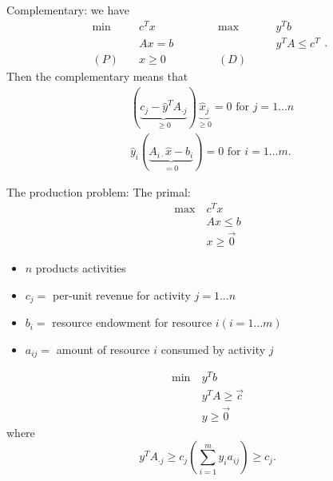 \begin{prev}
	Complementary: we have
	\[
		\begin{alignedat}{5}
			\min~&c^{T}x\qquad\qquad &&\max ~ &&y^{T}b\\
			&Ax = b && &&y^{T}A\leq c^{T}\\
			(P)\quad&x\geq  0 &&(D)\quad&&
		\end{alignedat}.
	\]
	Then the complementary means that
	\[
		\begin{split}
			&(\underbrace{c_{j} - \hat{y}^{T} A_{\cdot j}}_{\geq  0})\underbrace{\hat{x}_j}_{\geq 0} = 0 \text{ for }j = 1\ldots n\\
			&\hat{y}_i(\underbrace{A_{i\cdot}\hat{x} - b_{i}}_{=0}) = 0\text{ for }i = 1\ldots m.
		\end{split}
	\]
\end{prev}

\begin{prev}
	The production problem: The primal:
	\begin{align*}
		\max~ & c^Tx          \\
		      & Ax \leq b     \\
		      & x\geq \vec{0}
	\end{align*}
	\begin{itemize}
		\item \(n\) products activities
		\item \(c_{j}=\) per-unit revenue for activity \(j = 1\ldots n\)
		\item \(b_{i}=\) resource endowment for resource \(i(i = 1\ldots m)\)
		\item \(a_{ij}=\) amount of resource \(i\) consumed by activity \(j\)
	\end{itemize}
	\begin{align*}
		\min~ & y^{T}b               \\
		      & y^{T} A\geq  \vec{c} \\
		      & y\geq \vec{0}
	\end{align*}
	where \[
		y^{T}A_{\cdot j}\geq c_{j}(\sum\limits_{i=1}^{m} y_{i}a_{ij}) \geq c_{j}.
	\]
\end{prev}

